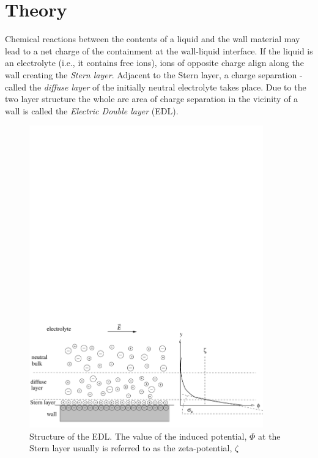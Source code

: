 \section{Theory}
Chemical reactions between the contents of a liquid and the wall material may lead to a net charge of the containment at the wall-liquid interface. If the liquid is an electrolyte (i.e., it contains free ions), ions of opposite charge align along the wall creating the \textit{Stern layer}. Adjacent to the Stern layer, a charge separation - called the \textit{diffuse layer} of the initially neutral electrolyte takes place. Due to the two layer structure the whole are area of charge separation in the vicinity of a wall is called the \textit{Electric Double layer} (EDL). 
\begin{figure}[tbhp]
\vspace{-11cm}
\centerline{\includegraphics[width=0.9\textwidth]{EDL_bw.pdf}}
\caption{\label{ek:Fig.EDL} Structure of the EDL. The value of the induced potential, $\Phi$ at the Stern layer usually is referred to as the zeta-potential, $\zeta$}
\end{figure}
